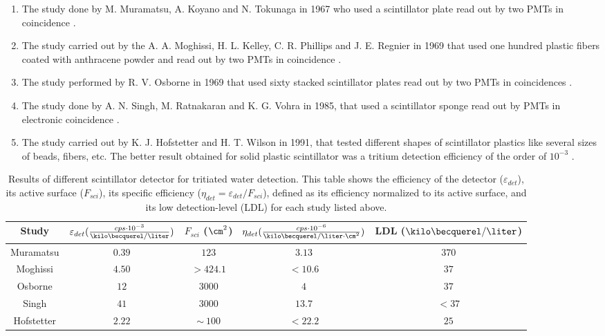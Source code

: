 \begin{enumerate}

\item{} The study done by M. Muramatsu, A. Koyano and N. Tokunaga in 1967 who used a scintillator plate read out by two PMTs in coincidence \cite{Muramatsu}.

\item{} The study carried out by the A. A. Moghissi, H. L. Kelley, C. R. Phillips and J. E. Regnier in 1969 that used one hundred plastic fibers coated with anthracene powder and read out by two PMTs in coincidence \cite{Moghissi}.

\item{} The study performed by R. V. Osborne in 1969 that used sixty stacked scintillator plates read out by two PMTs in coincidences \cite{Osborne}.

\item{} The study done by A. N. Singh, M. Ratnakaran and K. G. Vohra in 1985, that used a scintillator sponge read out by PMTs in electronic coincidence \cite{Ratnakaran, Ratnakaran2000}.

\item{} The study carried out by K. J. Hofstetter and H. T. Wilson in 1991, that tested different shapes of scintillator plastics like several sizes of beads, fibers, etc. The better result obtained for solid plastic scintillator was a tritium detection efficiency of the order of $10^{-3}$ \cite{Hofstetter1, Hofstetter2}.

\end{enumerate}
\begin{table}[htbp]
\begin{center}
\begin{tabular}{|c|c|c|c|c|}
\hline
Study & \parbox{5.5em}{\centering $\varepsilon_{det}(\frac{cps \cdot{} 10^{-3}}{\kilo\becquerel/\liter})$}  & \parbox{4.5em}{\centering $F_{sci}$ ($\cm^2$)}  & \parbox{6.5em}{\centering $\eta_{det}(\frac{cps \cdot{} 10^{-6}}{\kilo\becquerel/ \liter \cdot{} \cm^2})$} & LDL ($\kilo\becquerel / \liter$)\\
\hline \hline \hline
Muramatsu & $0.39$ & $123$ & $3.13$ & $370$ \\ \hline
Moghissi & $4.50$ & $>424.1$ & $<10.6$ & $37$ \\\hline
Osborne & $12$ & $3000$ & $4$ & $37$ \\ \hline
Singh & $41$ & $3000$ & $13.7$ & $<37$ \\ \hline
Hofstetter & $2.22$ & $\sim~100$ & $<22.2$ & $25$ \\ \hline
\end{tabular}
\caption{Results of different scintillator detector for tritiated water detection. This table shows the efficiency of the detector ($\varepsilon_{det}$), its active surface ($F_{sci}$), its specific efficiency ($\eta_{det}=\varepsilon_{det}/F_{sci}$), defined as its efficiency normalized to its active surface, and its low detection-level (LDL) for each study listed above.}
\label{tab:PlasticScinTritium}
\end{center}
\end{table}

